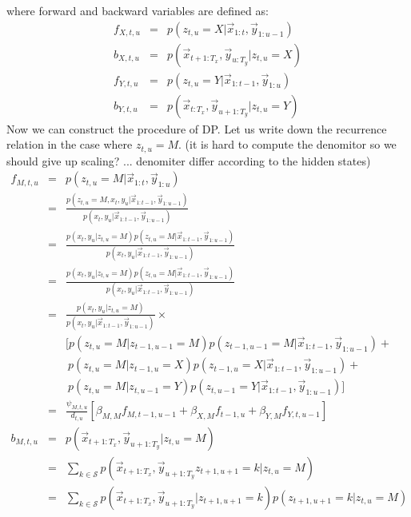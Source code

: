 where forward and backward variables are defined as:
\begin{eqnarray}
  f_{X, t, u} &=& p(z_{t, u}=X | \vec{x}_{1:t}, \vec{y}_{1:u-1}) \\
  b_{X, t, u} &=& p(\vec{x}_{t+1:T_x}, \vec{y}_{u:T_y} | z_{t, u}= X)  \\
  f_{Y, t, u} &=& p(z_{t, u}=Y | \vec{x}_{1:t-1}, \vec{y}_{1:u}) \\
  b_{Y, t, u} &=& p(\vec{x}_{t:T_x}, \vec{y}_{u+1:T_y} | z_{t, u}= Y) 
\end{eqnarray}
Now we can construct the procedure of DP. Let us write down the recurrence relation in the case where $z_{t,u} = M$. (it is hard to compute the denomitor so we should give up scaling? ... denomiter differ according to the hidden states)
\begin{eqnarray}
f_{M, t, u} &=& p(z_{t, u}=M | \vec{x}_{1:t}, \vec{y}_{1:u}) \nonumber \\
            &=& \frac{p(z_{t, u}=M, x_t, y_u | \vec{x}_{1:t-1}, \vec{y}_{1:u-1})} {p(x_t, y_u | \vec{x}_{1:t-1}, \vec{y}_{1:u-1})} \nonumber \\
            &=& \frac{p(x_t, y_u |z_{t, u}=M) p(z_{t, u}=M| \vec{x}_{1:t-1}, \vec{y}_{1:u-1})} {p(x_t, y_u | \vec{x}_{1:t-1}, \vec{y}_{1:u-1})} \nonumber\\
            &=& \frac{p(x_t, y_u |z_{t, u}=M) p(z_{t, u}=M| \vec{x}_{1:t-1}, \vec{y}_{1:u-1})} {p(x_t, y_u | \vec{x}_{1:t-1}, \vec{y}_{1:u-1})} \nonumber\\
            &=& \frac{p(x_t, y_u |z_{t, u}=M)} {p(x_t, y_u | \vec{x}_{1:t-1}, \vec{y}_{1:u-1})} \times \nonumber \\
&&\big[p(z_{t, u}=M| z_{t-1, u-1} = M)p(z_{t-1,u-1} = M | \vec{x}_{1:t-1}, \vec{y}_{1:u-1}) + \nonumber \\
&&\ p(z_{t, u}=M| z_{t-1, u} = X)p(z_{t-1,u} = X | \vec{x}_{1:t-1}, \vec{y}_{1:u-1}) + \nonumber \\
&&\ p(z_{t, u}=M| z_{t, u-1} = Y)p(z_{t,u-1} = Y | \vec{x}_{1:t-1}, \vec{y}_{1:u-1})  \big]\nonumber \\
&=& \frac{\psi_{M, t, u}}{d_{t,u}} [\beta_{M,M} f_{M,t-1,u-1} + \beta_{X,M} f_{t-1, u} + \beta_{Y,M} f_{Y, t, u-1}]\\
  b_{M, t, u}
            &=& p(\vec{x}_{t+1:T_x}, \vec{y}_{u+1:T_y} | z_{t, u}= M) \nonumber \\
            &=& \sum_{k \in \mathcal{S}}p(\vec{x}_{t+1:T_x}, \vec{y}_{u+1:T_y} z_{t+1, u+1} = k| z_{t, u}= M) \nonumber\\
            &=& \sum_{k \in \mathcal{S}}p(\vec{x}_{t+1:T_x}, \vec{y}_{u+1:T_y}|z_{t+1, u+1}=k) p(z_{t+1, u+1} = k| z_{t, u}= M)\nonumber \\ 

\end{eqnarray}

